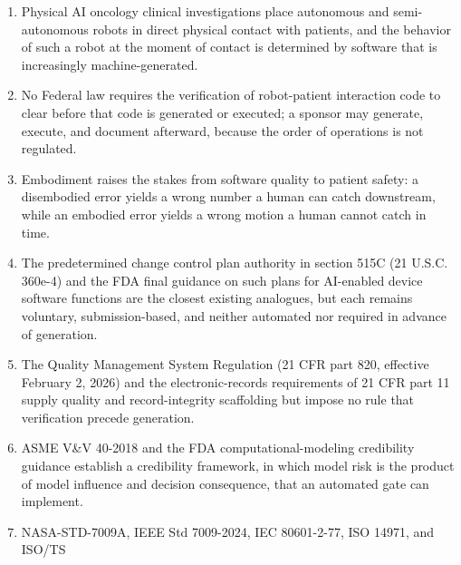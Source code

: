 \label{toc:aD}


\begin{enumerate}[leftmargin=2.0em,itemsep=2pt,topsep=2pt,label=(\arabic*)]
\item Physical AI oncology clinical investigations place autonomous and
semi-autonomous robots in direct physical contact with patients, and the behavior
of such a robot at the moment of contact is determined by software that is
increasingly machine-generated.
\item No Federal law requires the verification of robot-patient interaction code to
clear before that code is generated or executed; a sponsor may generate, execute,
and document afterward, because the order of operations is not regulated.
\item Embodiment raises the stakes from software quality to patient safety: a
disembodied error yields a wrong number a human can catch downstream, while an
embodied error yields a wrong motion a human cannot catch in time.
\item The predetermined change control plan authority in section 515C (21 U.S.C.
360e-4) and the FDA final guidance on such plans for AI-enabled device software
functions are the closest existing analogues, but each remains voluntary,
submission-based, and neither automated nor required in advance of generation.
\item The Quality Management System Regulation (21 CFR part 820, effective February
2, 2026) and the electronic-records requirements of 21 CFR part 11 supply quality
and record-integrity scaffolding but impose no rule that verification precede
generation.
\item ASME V\&V 40-2018 and the FDA computational-modeling credibility guidance
establish a credibility framework, in which model risk is the product of model
influence and decision consequence, that an automated gate can implement.
\item NASA-STD-7009A, IEEE Std 7009-2024, IEC 80601-2-77, ISO 14971, and ISO/TS

\end{enumerate}
